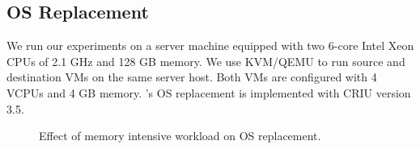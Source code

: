 \subsection{OS Replacement}
We run our experiments on a server machine equipped with two 6-core Intel Xeon CPUs of 2.1 GHz and 128 GB memory. We use KVM/QEMU to run source and destination VMs on the same server host. Both VMs are configured with 4 VCPUs and 4 GB memory. \arch's OS replacement is implemented with CRIU version 3.5. 

\begin{figure}
	\centering
	\caption{Effect of memory intensive workload on OS replacement.}
	\label{fig:variation23}
    \vspace{0.2in}
\end{figure}

